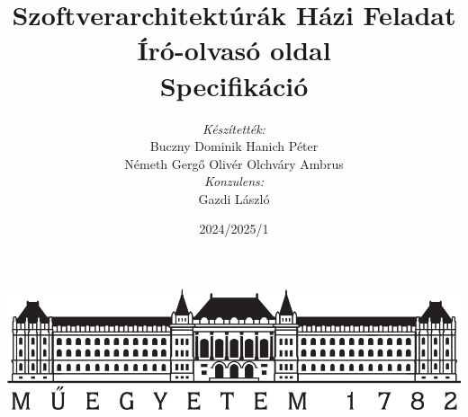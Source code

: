 \author{\textit{Készítették:}\\ Buczny Dominik \hspace{5pt} Hanich Péter \\ Németh Gergő Olivér \hspace{5pt} Olchváry Ambrus \\[10pt] \textit{Konzulens:}\\ Gazdi László}
\title{Szoftverarchitektúrák Házi Feladat \\ Író-olvasó oldal \\ \textbf{Specifikáció}}
\date{2024/2025/1}
\maketitle
\thispagestyle{empty}
\begin{center}
    \includegraphics[width=\textwidth,height=\textheight,keepaspectratio]{./figures/logo.png}
\end{center}